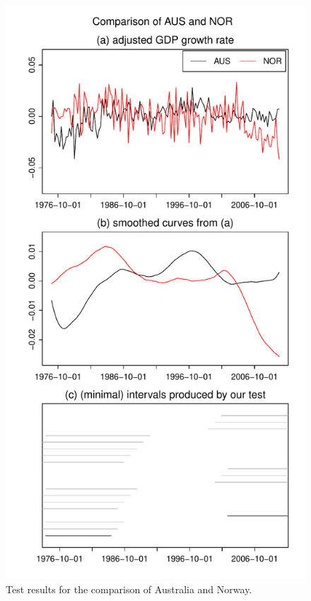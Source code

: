 \documentclass[12pt]{article}
\begin{document}
\begin{figure}
\begin{minipage}[t]{0.24\textwidth}
\includegraphics[width=\textwidth]{output/plots/gdp/AUS_vs_NOR}
\caption{Test results for the comparison of Australia and Norway.}\label{fig:Australia:Norway}
\end{minipage}

\end{figure}
\end{document}
